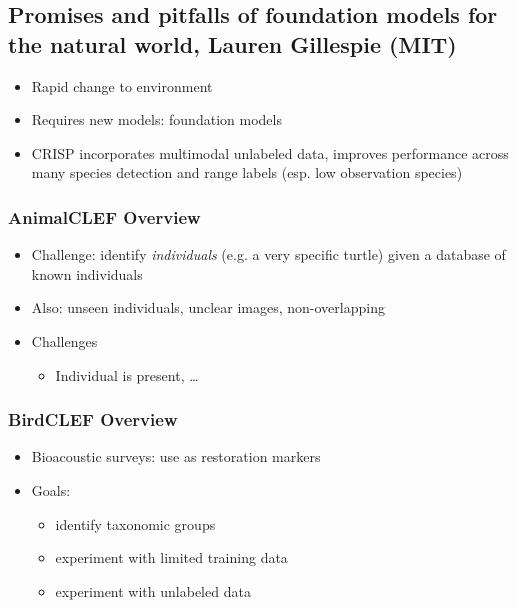 \documentclass[a4paper]{article}
\begin{document}
\subsection{Promises and pitfalls of foundation models for the natural world, Lauren Gillespie (MIT)}
\begin{itemize}
    \item Rapid change to environment
    \item Requires new models: foundation models
    \item CRISP incorporates multimodal unlabeled data, improves performance across many species detection and range labels (esp. low observation species)
\end{itemize}

\subsubsection{AnimalCLEF Overview}
\begin{itemize}
    \item Challenge: identify \emph{individuals} (e.g. a very specific turtle) given a database of known individuals
    \item Also: unseen individuals, unclear images, non-overlapping
    \item Challenges
          \begin{itemize}
              \item Individual is present, \dots
          \end{itemize}
\end{itemize}

\subsubsection{BirdCLEF Overview}
\begin{itemize}
    \item Bioacoustic surveys: use as restoration markers
    \item Goals:
          \begin{itemize}
              \item identify taxonomic groups
              \item experiment with limited training data
              \item experiment with unlabeled data
          \end{itemize}
\end{itemize}
\end{document}
